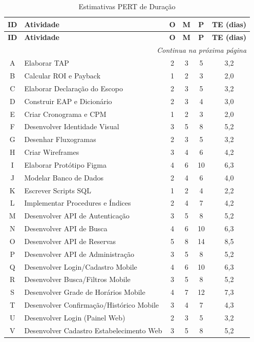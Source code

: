 \documentclass[12pt,a4paper,oneside]{report}
\begin{document}
\begin{longtable}{c p{5.5cm} c c c c}
\caption{Estimativas PERT de Duração} \\
\toprule
\textbf{ID} & \textbf{Atividade} & \textbf{O} & \textbf{M} & \textbf{P} & \textbf{TE (dias)} \\
\midrule
\endfirsthead
\toprule
\textbf{ID} & \textbf{Atividade} & \textbf{O} & \textbf{M} & \textbf{P} & \textbf{TE (dias)} \\
\midrule
\endhead
\midrule
\multicolumn{6}{r}{\textit{Continua na próxima página}} \\
\endfoot
\bottomrule
\endlastfoot
A & Elaborar TAP & 2 & 3 & 5 & 3,2 \\
B & Calcular ROI e Payback & 1 & 2 & 3 & 2,0 \\
C & Elaborar Declaração do Escopo & 2 & 3 & 5 & 3,2 \\
D & Construir EAP e Dicionário & 2 & 3 & 4 & 3,0 \\
E & Criar Cronograma e CPM & 1 & 2 & 3 & 2,0 \\
F & Desenvolver Identidade Visual & 3 & 5 & 8 & 5,2 \\
G & Desenhar Fluxogramas & 2 & 3 & 5 & 3,2 \\
H & Criar Wireframes & 3 & 4 & 6 & 4,2 \\
I & Elaborar Protótipo Figma & 4 & 6 & 10 & 6,3 \\
J & Modelar Banco de Dados & 2 & 4 & 6 & 4,0 \\
K & Escrever Scripts SQL & 1 & 2 & 4 & 2,2 \\
L & Implementar Procedures e Índices & 2 & 4 & 7 & 4,2 \\
M & Desenvolver API de Autenticação & 3 & 5 & 8 & 5,2 \\
N & Desenvolver API de Busca & 4 & 6 & 10 & 6,3 \\
O & Desenvolver API de Reservas & 5 & 8 & 14 & 8,5 \\
P & Desenvolver API de Administração & 3 & 5 & 8 & 5,2 \\
Q & Desenvolver Login/Cadastro Mobile & 4 & 6 & 10 & 6,3 \\
R & Desenvolver Busca/Filtros Mobile & 3 & 5 & 8 & 5,2 \\
S & Desenvolver Grade de Horários Mobile & 4 & 7 & 12 & 7,3 \\
T & Desenvolver Confirmação/Histórico Mobile & 3 & 4 & 7 & 4,3 \\
U & Desenvolver Login (Painel Web) & 2 & 3 & 5 & 3,2 \\
V & Desenvolver Cadastro Estabelecimento Web & 3 & 5 & 8 & 5,2 \\

\end{longtable}
\end{document}
